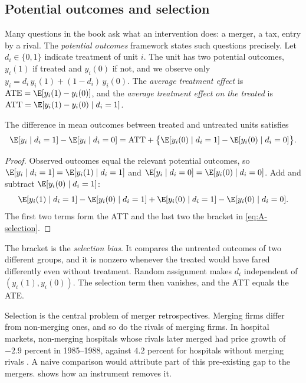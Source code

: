 \subsection{Potential outcomes and selection}\label{sec:A-potential}

Many questions in the book ask what an intervention does: a merger, a tax, entry by a rival. The
\emph{potential outcomes} framework states such questions precisely. Let $d_i \in \{0, 1\}$ indicate
treatment of unit $i$. The unit has two potential outcomes, $y_i(1)$ if treated and $y_i(0)$ if not, and we
observe only $y_i = d_i\,y_i(1) + (1 - d_i)\,y_i(0)$. The \emph{average treatment effect} is
$\mathrm{ATE} = \E[y_i(1) - y_i(0)]$, and the \emph{average treatment effect on the treated} is
$\mathrm{ATT} = \E[y_i(1) - y_i(0) \mid d_i = 1]$.

\begin{proposition}\label{prop:A-selection}
The difference in mean outcomes between treated and untreated units satisfies
\begin{equation}\label{eq:A-selection}
\E[y_i \mid d_i = 1] - \E[y_i \mid d_i = 0]
= \mathrm{ATT} + \bigl\{\E[y_i(0) \mid d_i = 1] - \E[y_i(0) \mid d_i = 0]\bigr\} .
\end{equation}
\end{proposition}

\begin{proof}
Observed outcomes equal the relevant potential outcomes, so $\E[y_i \mid d_i = 1] = \E[y_i(1) \mid d_i = 1]$
and $\E[y_i \mid d_i = 0] = \E[y_i(0) \mid d_i = 0]$. Add and subtract $\E[y_i(0) \mid d_i = 1]$:
\begin{equation*}
\E[y_i(1) \mid d_i = 1] - \E[y_i(0) \mid d_i = 1] + \E[y_i(0) \mid d_i = 1] - \E[y_i(0) \mid d_i = 0] .
\end{equation*}
The first two terms form the ATT and the last two the bracket in \eqref{eq:A-selection}.
\end{proof}

The bracket is the \emph{selection bias}. It compares the untreated outcomes of two different groups, and it
is nonzero whenever the treated would have fared differently even without treatment. Random assignment makes
$d_i$ independent of $(y_i(1), y_i(0))$. The selection term then vanishes, and the ATT equals the ATE.

Selection is the central problem of merger retrospectives. Merging firms differ from non-merging ones, and
so do the rivals of merging firms. In hospital markets, non-merging hospitals whose rivals later merged had
price growth of $-2.9$ percent in 1985--1988, against $4.2$ percent for hospitals without merging rivals
\citep[p.~16]{Dafny2005}. A naive comparison would attribute part of this pre-existing gap to the mergers.
 shows how an instrument removes it.

